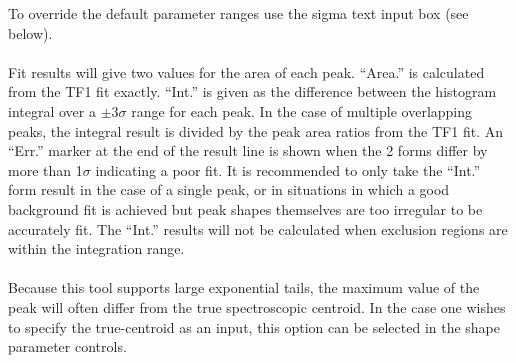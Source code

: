\documentclass[a4paper,10pt]{article}
\begin{document}
To override the default parameter ranges use the sigma text input box (see below).
\\
\\
Fit results will give two values for the area of each peak.
``Area.'' is calculated from the TF1 fit exactly.
``Int.'' is given as the difference between the histogram integral over a $\pm3\sigma$ range for each peak.
In the case of multiple overlapping peaks, the integral result is divided by the peak area ratios from the TF1 fit. 
An ``Err.'' marker at the end of the result line is shown when the 2 forms differ by more than 1$\sigma$ indicating a poor fit.
It is recommended to only take the ``Int.'' form result in the case of a single peak, or in situations in which a good background fit is achieved but peak shapes themselves are too irregular to be accurately fit.
The ``Int.'' results will not be calculated when exclusion regions are within the integration range.
\\
\\
Because this tool supports large exponential tails, the maximum value of the peak will often differ from the true spectroscopic centroid. In the case one wishes to specify the true-centroid as an input, this option can be selected in the shape parameter controls.
\end{document}
